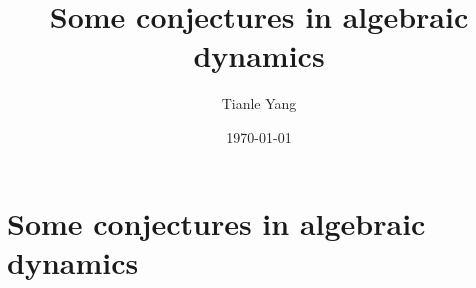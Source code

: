 \documentclass[sectionlevel=section,status=draft]{noteformyself}
\title{Some conjectures in algebraic dynamics}
\author{Tianle Yang}
\date{\today}
\begin{document}
    \maketitle

    \section[
      status=draft,
      tag=00000,
      label=\labelNFM{sec:the-first-introduction:some-conjectures}
    ]{Some conjectures in algebraic dynamics}



\end{document}
